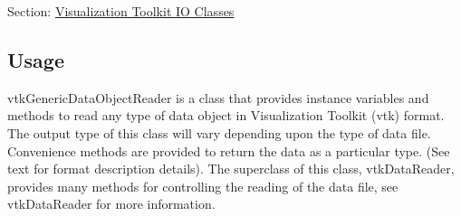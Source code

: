 Section\-: \hyperlink{sec_vtkio}{Visualization Toolkit I\-O Classes} \hypertarget{vtkwidgets_vtkxyplotwidget_Usage}{}\subsection{Usage}\label{vtkwidgets_vtkxyplotwidget_Usage}
vtk\-Generic\-Data\-Object\-Reader is a class that provides instance variables and methods to read any type of data object in Visualization Toolkit (vtk) format. The output type of this class will vary depending upon the type of data file. Convenience methods are provided to return the data as a particular type. (See text for format description details). The superclass of this class, vtk\-Data\-Reader, provides many methods for controlling the reading of the data file, see vtk\-Data\-Reader for more information.

